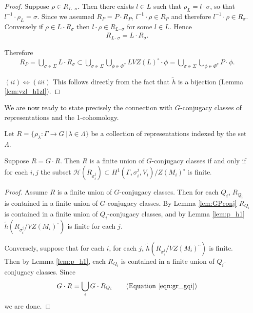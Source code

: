 \begin{proof}
  Suppose $\rho \in R_{L \cdot \sigma}$. Then there exists $l \in L$ such that $\rho_L = l \cdot \sigma$, so that $l^{-1} \cdot \rho_L = \sigma$. Since we assumed $R_P = P \cdot R_P$, $l^{-1} \cdot \rho \in R_P$ and therefore $l^{-1} \cdot \rho \in R_\sigma$. Conversely if $\rho \in L \cdot R_\sigma$ then $l \cdot \rho \in R_{L \cdot \sigma}$ for some $l \in L$. Hence
  \begin{align*}
    R_{L \cdot \sigma} = L \cdot R_\sigma.
  \end{align*}

  Therefore
  \begin{align*}
    R_P = \bigcup_{\sigma \in \Sigma} L \cdot R_\sigma \subset \bigcup_{\sigma \in \Sigma}\bigcup_{\phi \in \Phi^\sigma} LVZ(L)^\circ \cdot \phi = \bigcup_{\sigma \in \Sigma}\bigcup_{\phi \in \Phi^\sigma} P \cdot \phi.
  \end{align*}

  $(ii) \Leftrightarrow (iii)$ This follows directly from the fact that $\tilde{h}$ is a bijection (Lemma \ref{lem:vzl_h1zl}).

\end{proof}

We are now ready to state precisely the connection with $G$-conjugacy classes of representations and the 1-cohomology.

\begin{theorem}
  Let $R=\{\rho_\lambda:\Gamma\rightarrow G\,|\,\lambda \in \Lambda\}$ be a collection of representations indexed by the set $\Lambda$. 
  
  Suppose $R = G \cdot R$. Then $R$ is a finite union of $G$-conjugacy classes if and only if for each $i, j$ the subset $\mathcal{H}(R_{\sigma_i^j}) \subset H^1(\Gamma, \sigma_i^j, V_i) / Z(M_i)^\circ$ is finite.
  \label{thm:g_h1}
\end{theorem}
\begin{proof}
  Assume $R$ is a finite union of $G$-conjugacy classes. Then for each $Q_i$, $R_{Q_i}$ is contained in a finite union of $G$-conjugacy classes. By Lemma \ref{lem:GPconj} $R_{Q_i}$ is contained in a finite union of $Q_i$-conjugacy classes, and by Lemma \ref{lem:p_h1} $\tilde{h}(R_{\sigma_i^j}/VZ(M_i)^\circ)$ is finite for each $j$.

  Conversely, suppose that for each $i$, for each $j$, $\tilde{h}(R_{\sigma_i^j}/VZ(M_i)^\circ)$ is finite. Then by Lemma \ref{lem:p_h1}, each $R_{Q_i}$ is contained in a finite union of $Q_i$-conjugacy classes. Since
  \begin{align*}
    G \cdot R = \bigcup_i G \cdot R_{Q_i} \qquad (\textrm{Equation }\ref{eqn:gr_gqi})
  \end{align*}
  we are done.
\end{proof}

